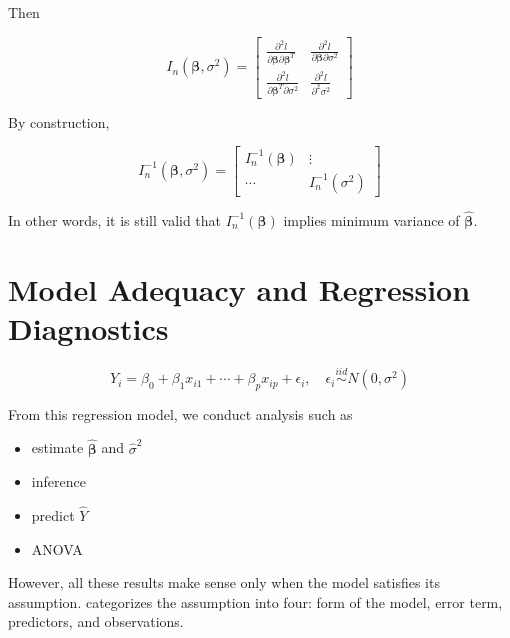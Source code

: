 \documentclass[]{book}
\providecommand{\tightlist}{%
  \setlength{\itemsep}{0pt}\setlength{\parskip}{0pt}}
\theoremstyle{definition}
\theoremstyle{definition}
\theoremstyle{definition}
\theoremstyle{remark}
\begin{document}
Then

\begin{equation}
  I_n(\boldsymbol\beta, \sigma^2) = \left[\begin{array}{c|c}
    \frac{\partial^2 l}{\partial \boldsymbol\beta\partial \boldsymbol\beta^T} & \frac{\partial^2 l}{\partial \boldsymbol\beta\partial \sigma^2} \\ \hline
    \frac{\partial^2 l}{\partial \boldsymbol\beta^T \partial \sigma^2} & \frac{\partial^2 l}{\partial^2 \sigma^2}
  \end{array}\right]
  \label{eq:blockinform}
\end{equation}

By construction,

\begin{equation}
  I_n^{-1}(\boldsymbol\beta, \sigma^2) = \left[\begin{array}{c|c}
    I_n^{-1}(\boldsymbol\beta) & \vdots \\ \hline
    \cdots & I_n^{-1}(\sigma^2)
  \end{array}\right]
  \label{eq:blockinforminv}
\end{equation}

In other words, it is still valid that \(I_n^{-1}(\boldsymbol\beta)\) implies minimum variance of \(\boldsymbol{\hat\beta}\).

\hypertarget{regdiag}{%
\chapter{Model Adequacy and Regression Diagnostics}\label{regdiag}}

\[Y_i = \beta_0 + \beta_1 x_{i1} + \cdots + \beta_p x_{ip} + \epsilon_{i}, \quad \epsilon_i \stackrel{iid}{\sim}N(0, \sigma^2)\]

From this regression model, we conduct analysis such as

\begin{itemize}
\tightlist
\item
  estimate \(\boldsymbol{\hat\beta}\) and \(\hat\sigma^2\)
\item
  inference
\item
  predict \(\hat{Y}\)
\item
  ANOVA
\end{itemize}

However, all these results make sense only when the model satisfies its assumption. \citet{Chatterjee:2015aa} categorizes the assumption into four: form of the model, error term, predictors, and observations.
\end{document}
